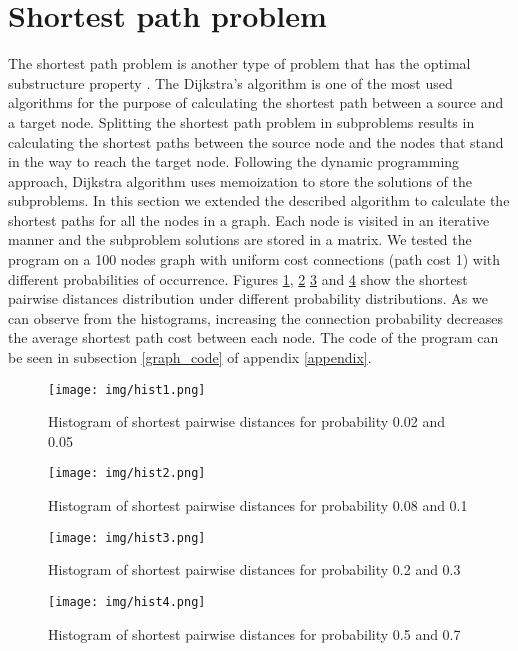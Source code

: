 \documentclass[runningheads]{llncs}
\begin{document}
\section{Shortest path problem}
The shortest path problem is another type of problem that has the
optimal substructure property \cite{dijkstra}. The Dijkstra's
algorithm is one of the most used algorithms for the purpose of
calculating the shortest path between a source and a target
node. Splitting the shortest path problem in subproblems results in
calculating the shortest paths between the source node and the nodes
that stand in the way to reach the target node. Following the dynamic
programming approach, Dijkstra algorithm uses memoization to store the
solutions of the subproblems. In this section we extended the
described algorithm to calculate the shortest paths for all the nodes
in a graph. Each node is visited in an iterative manner and the
subproblem solutions are stored in a matrix. We tested the program on
a 100 nodes graph with uniform cost connections (path cost 1) with
different probabilities of occurrence. Figures \ref{hist1},
\ref{hist2} \ref{hist3} and \ref{hist4} show the shortest pairwise
distances distribution under different probability distributions. As
we can observe from the histograms, increasing the connection
probability decreases the average shortest path cost between each node.
The code of the program can be seen in subsection \ref{graph_code} of
appendix \ref{appendix}.
\begin{figure}
\texttt{[image: img/hist1.png]}
\caption{Histogram of shortest pairwise distances for probability 0.02
and 0.05} \label{hist1}
\end{figure}
\begin{figure}
\texttt{[image: img/hist2.png]}
\caption{Histogram of shortest pairwise distances for probability 0.08
and 0.1} \label{hist2}
\end{figure}
\begin{figure}
\texttt{[image: img/hist3.png]}
\caption{Histogram of shortest pairwise distances for probability 0.2
and 0.3} \label{hist3}
\end{figure}
\begin{figure}
\texttt{[image: img/hist4.png]}
\caption{Histogram of shortest pairwise distances for probability 0.5
and 0.7} \label{hist4}
\end{figure}
\end{document}
